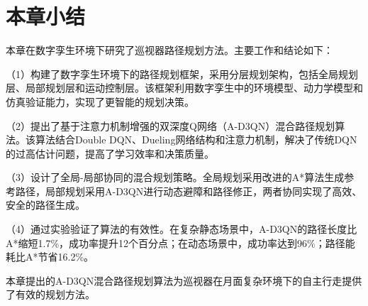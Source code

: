 \section{本章小结}
\label{sec:ch6_summary}

本章在数字孪生环境下研究了巡视器路径规划方法。主要工作和结论如下：

（1）构建了数字孪生环境下的路径规划框架，采用分层规划架构，包括全局规划层、局部规划层和运动控制层。该框架利用数字孪生中的环境模型、动力学模型和仿真验证能力，实现了更智能的规划决策。

（2）提出了基于注意力机制增强的双深度Q网络（A-D3QN）混合路径规划算法。该算法结合Double DQN、Dueling网络结构和注意力机制，解决了传统DQN的过高估计问题，提高了学习效率和决策质量。

（3）设计了全局-局部协同的混合规划策略。全局规划采用改进的A*算法生成参考路径，局部规划采用A-D3QN进行动态避障和路径修正，两者协同实现了高效、安全的路径生成。

（4）通过实验验证了算法的有效性。在复杂静态场景中，A-D3QN的路径长度比A*缩短1.7\%，成功率提升12个百分点；在动态场景中，成功率达到96\%；路径能耗比A*节省16.2\%。

本章提出的A-D3QN混合路径规划算法为巡视器在月面复杂环境下的自主行走提供了有效的规划方法。
